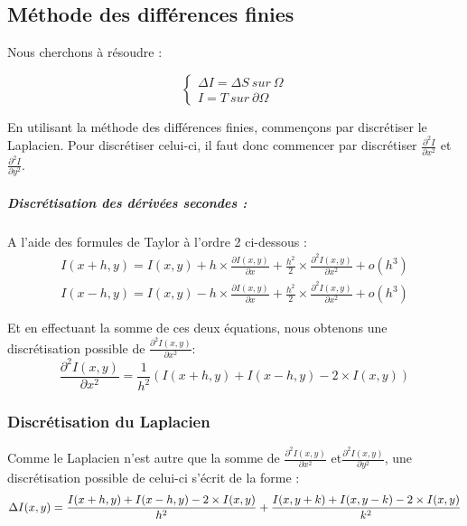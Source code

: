 \subsection{Méthode des différences finies}
Nous cherchons à résoudre  : 
\begin{center}

\begin{equation*}
    \left \{
    \begin{aligned}
    \Delta I = \Delta S \ sur \ \Omega\\
    I = T \ sur \ \partial \Omega
    \end{aligned}
    \right.
\end{equation*}
\end{center}

En utilisant la méthode des différences finies, commençons par discrétiser le Laplacien.
Pour discrétiser celui-ci, il faut donc commencer par discrétiser $\frac{\partial^2 I}{\partial x^2}$ et  $\frac{\partial^2 I}{\partial y^2}$. 

\subparagraph{Discrétisation des dérivées secondes :}

A l'aide des formules de Taylor à l'ordre 2 ci-dessous : 
\begin{equation*}
\begin{aligned}
    I(x+h,y) = I(x,y)+h\times \frac{\partial I(x,y)}{\partial x}+ \frac{h^2}{2} \times \frac{\partial ^2 I(x,y)}{\partial x^2} + o(h^3) \\
    I(x-h,y) =I(x,y)- h\times  \frac{\partial I(x,y)}{\partial x}+ \frac{h^2}{2} \times \frac{\partial^2 I(x,y)}{\partial x^2} + o(h^3)
\end{aligned}
\end{equation*}


Et en effectuant la somme de ces deux équations, nous obtenons une discrétisation possible de $\frac{\partial ^2 I(x,y)}{\partial x^2}$:  
\begin{equation*}
    \frac{\partial ^2 I(x,y)}{\partial x^2} =\frac{1}{h^2}\left( I(x+h,y) + I(x-h,y) - 2\times I(x,y)\right)
\end{equation*}

\subsubsection{Discrétisation du Laplacien}
Comme le Laplacien n'est autre que la somme de $\frac{\partial ^2 I(x,y)}{\partial x^2}$ et$\frac{\partial ^2 I(x,y)}{\partial y^2}$, une discrétisation possible de celui-ci s'écrit de la forme  : 
\begin{equation*}
    \Delta I(x,y) =  \frac{I(x+h,y) + I(x-h,y) - 2\times I(x,y)}{h^2}  + \frac{I(x,y+k) + I(x,y-k) - 2\times I(x,y)}{k^2} \\
\end{equation*}

